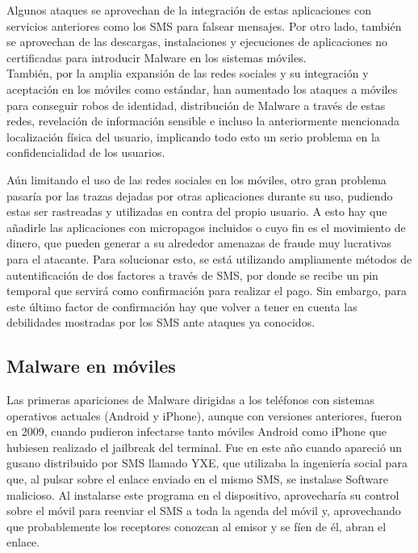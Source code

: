 \documentclass[11pt]{article}
\begin{document}
{Algunos ataques se aprovechan de la integración de estas aplicaciones con servicios anteriores como los SMS para falsear mensajes. Por otro lado, también se aprovechan de las descargas, instalaciones y ejecuciones de aplicaciones no certificadas para introducir Malware en los sistemas móviles.} \\

{También, por la amplia expansión de las redes sociales y su integración y aceptación en los móviles como estándar, han aumentado los ataques a móviles para conseguir robos de identidad, distribución de Malware a través de estas redes, revelación de información sensible e incluso la anteriormente mencionada localización física del usuario, implicando todo esto un serio problema en la confidencialidad de los usuarios.} \\

{Aún limitando el uso de las redes sociales en los móviles, otro gran problema pasaría por las trazas dejadas por otras aplicaciones durante su uso, pudiendo estas ser rastreadas y utilizadas en contra del propio usuario. A esto hay que añadirle las aplicaciones con micropagos incluidos o cuyo fin es el movimiento de dinero, que pueden generar a su alrededor amenazas de fraude muy lucrativas para el atacante. Para solucionar esto, se está utilizando ampliamente métodos de autentificación de dos factores a través de SMS, por donde se recibe un pin temporal que servirá como confirmación para realizar el pago. Sin embargo, para este último factor de confirmación hay que volver a tener en cuenta las debilidades mostradas por los SMS ante ataques ya conocidos.

\newpage
\subsection{Malware en móviles}}

{Las primeras apariciones de Malware dirigidas a los teléfonos con sistemas operativos actuales (Android y iPhone), aunque con versiones anteriores, fueron en 2009, cuando pudieron infectarse tanto móviles Android como iPhone que hubiesen realizado el jailbreak del terminal. Fue en este año cuando apareció un gusano distribuido por SMS llamado YXE, que utilizaba la ingeniería social para que, al pulsar sobre el enlace enviado en el mismo SMS, se instalase Software malicioso. Al instalarse este programa en el dispositivo, aprovecharía su control sobre el móvil para reenviar el SMS a toda la agenda del móvil y, aprovechando que probablemente los receptores conozcan al emisor y se fíen de él, abran el enlace.} \\
\end{document}
